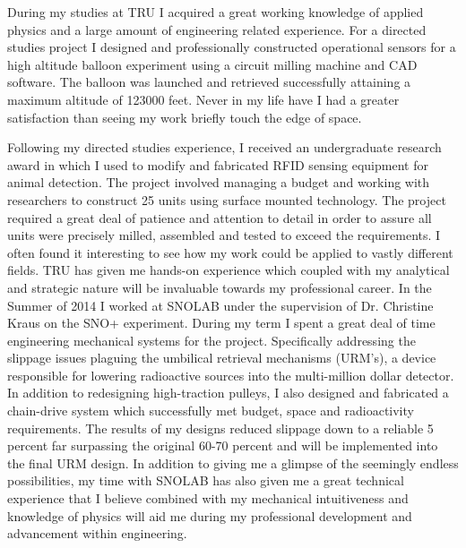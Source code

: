 \documentclass[11pt,a4paper]{moderncv} %
\begin{document}
  During my studies at TRU I acquired a great working knowledge of applied physics and a large amount of engineering related experience. For a directed studies project I designed and professionally constructed operational sensors for a high altitude balloon experiment using a circuit milling machine and CAD software. The balloon was launched and retrieved successfully attaining a maximum altitude of 123000 feet. Never in my life have I had a greater satisfaction than seeing my work briefly touch the edge of space. 

 Following my directed studies experience, I received an undergraduate research award in which I used to modify and fabricated RFID sensing equipment for animal detection. The project involved managing a budget and working with researchers to construct 25 units using surface mounted technology. The project required a great deal of patience and attention to detail in order to assure all units were precisely milled, assembled and tested to exceed the requirements. I often found it interesting to see how my work could be applied to vastly different fields. TRU has given me hands-on experience which coupled with my analytical and strategic nature will be invaluable towards my professional career.
\newline
\newline
\newline
\newline
  In the Summer of 2014 I worked at SNOLAB under the supervision of Dr. Christine Kraus on the SNO+ experiment. During my term I spent a great deal of time engineering mechanical systems for the project. Specifically addressing the slippage issues plaguing the umbilical retrieval mechanisms (URM's), a device responsible for lowering radioactive sources into the multi-million dollar detector. In addition to redesigning high-traction pulleys, I also designed and fabricated a chain-drive system which successfully met budget, space and radioactivity requirements. The results of my designs reduced slippage down to a reliable 5 percent far surpassing the original 60-70 percent and will be implemented into the final URM design. In addition to giving me a glimpse of the seemingly endless possibilities, my time with SNOLAB has also given me a great technical experience that I believe combined with my mechanical intuitiveness and knowledge of physics will aid me during my professional development and advancement within engineering.
\end{document}
